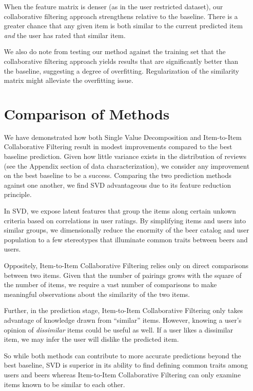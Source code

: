 \documentclass[12pt]{article}
\begin{document}
When the feature matrix is denser (as in the user restricted dataset), our collaborative filtering approach strengthens relative to the baseline. There is a greater chance that any given item is both similar to the current predicted item \textit{and} the user has rated that similar item.

We also do note from testing our method against the training set that the collaborative filtering approach yields results that are significantly better than the baseline, suggesting a degree of overfitting. Regularization of the similarity matrix might alleviate the overfitting issue.

\section{Comparison of Methods}
We have demonstrated how both Single Value Decomposition and Item-to-Item Collaborative Filtering result in modest improvements compared to the best baseline prediction. Given how little variance exists in the distribution of reviews (see the Appendix section of data characterization), we consider any improvement on the best baseline to be a success. Comparing the two prediction methods against one another, we find SVD advantageous due to its feature reduction principle.

In SVD, we expose latent features that group the items along certain unkown criteria based on correlations in user ratings. By simplifying items and users into similar groups, we dimensionally reduce the enormity of the beer catalog and user population to a few stereotypes that illuminate common traits between beers and users.

Oppositely, Item-to-Item Collaborative Filtering relies only on direct comparisons between two items. Given that the number of pairings grows with the square of the number of items, we require a vast number of comparisons to make meaningful observations about the similarity of the two items.

Further, in the prediction stage, Item-to-Item Collaborative Filtering only takes advantage of knowledge drawn from ``similar'' items. However, knowing a user's opinion of \textit{dissimilar} items could be useful as well. If a user likes a dissimilar item, we may infer the user will dislike the predicted item.

So while both methods can contribute to more accurate predictions beyond the best baseline, SVD is superior in its ability to find defining common traits among users and beers whereas Item-to-Item Collaborative Filtering can only examine items known to be similar to each other.
\end{document}
